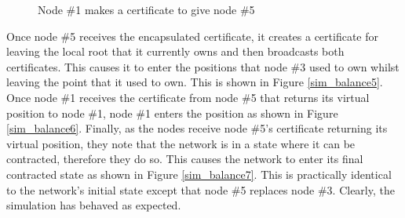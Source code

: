 \documentclass[ %
                    author={Luke Murray},
                supervisor={Dr. Simon Hollis},
                     title={Shadow Peer-to-Peer Networks},
                  subtitle={},
                    degree={MEng},
                      year={2013} ]{thesis}
\begin{document}
\begin{figure}[h]
\begin{minipage}[b]{0.45\linewidth}
        \caption{Node \#1 makes a certificate to give node \#5}
        \label{sim_balance4}
    \end{minipage}
\end{figure}

Once node \#5 receives the encapsulated certificate, it creates a certificate for leaving the local root that it currently owns and then broadcasts both certificates. This causes it to enter the positions that node \#3 used to own whilst leaving the point that it used to own. This is shown in Figure \ref{sim_balance5}. Once node \#1 receives the certificate from node \#5 that returns its virtual position to node \#1, node \#1 enters the position as shown in Figure \ref{sim_balance6}. Finally, as the nodes receive node \#5's certificate returning its virtual position, they note that the network is in a state where it can be contracted, therefore they do so. This causes the network to enter its final contracted state as shown in Figure \ref{sim_balance7}. This is practically identical to the network's initial state except that node \#5 replaces node \#3. Clearly, the simulation has behaved as expected.
\end{document}

